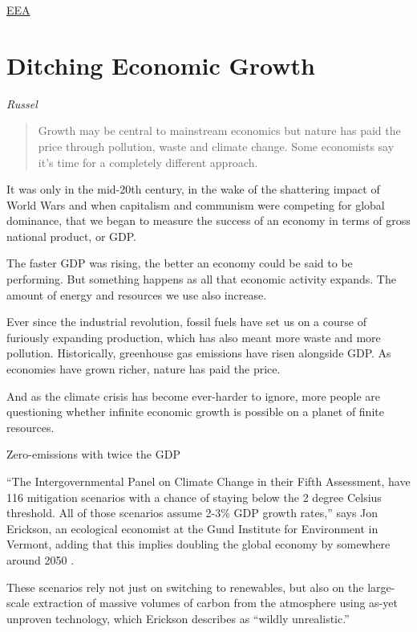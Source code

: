 \documentclass[
]{book}
\begin{document}
\href{https://www.eea.europa.eu/publications/growth-without-economic-growth}{EEA}

\hypertarget{ditching-economic-growth}{%
\section{Ditching Economic Growth}\label{ditching-economic-growth}}

\emph{Russel}

\begin{quote}
Growth may be central to mainstream economics but nature has paid the price through pollution, waste and climate change. Some economists say it's time for a completely different approach.
\end{quote}

It was only in the mid-20th century, in the wake of the shattering impact of World Wars and when capitalism and communism were competing for global dominance, that we began to measure the success of an economy in terms of gross national product, or GDP.

The faster GDP was rising, the better an economy could be said to be performing. But something happens as all that economic activity expands. The amount of energy and resources we use also increase.

Ever since the industrial revolution, fossil fuels have set us on a course of furiously expanding production, which has also meant more waste and more pollution. Historically, greenhouse gas emissions have risen alongside GDP. As economies have grown richer, nature has paid the price.

And as the climate crisis has become ever-harder to ignore, more people are questioning whether infinite economic growth is possible on a planet of finite resources.

Zero-emissions with twice the GDP

``The Intergovernmental Panel on Climate Change in their Fifth Assessment, have 116 mitigation scenarios with a chance of staying below the 2 degree Celsius threshold. All of those scenarios assume 2-3\% GDP growth rates,'' says Jon Erickson, an ecological economist at the Gund Institute for Environment in Vermont, adding that this implies doubling the global economy by somewhere around 2050 .

These scenarios rely not just on switching to renewables, but also on the large-scale extraction of massive volumes of carbon from the atmosphere using as-yet unproven technology, which Erickson describes as ``wildly unrealistic.''
\end{document}
